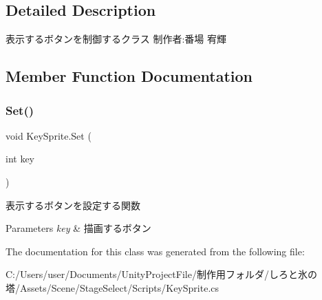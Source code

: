 \subsection{Detailed Description}
表示するボタンを制御するクラス 制作者\+:番場 宥輝 



\subsection{Member Function Documentation}
\mbox{\label{class_key_sprite_a04255b122af47585fc67ac88d83f4900}} 
\subsubsection{\texorpdfstring{Set()}{Set()}}
{\footnotesize\ttfamily void Key\+Sprite.\+Set (\begin{DoxyParamCaption}\item[{int}]{key }\end{DoxyParamCaption})\hspace{0.3cm}{\ttfamily [inline]}}



表示するボタンを設定する関数 


\begin{DoxyParams}{Parameters}
{\em key} & 描画するボタン\\
\hline
\end{DoxyParams}


The documentation for this class was generated from the following file\+:\begin{DoxyCompactItemize}
\item 
C\+:/\+Users/user/\+Documents/\+Unity\+Project\+File/制作用フォルダ/しろと氷の塔/\+Assets/\+Scene/\+Stage\+Select/\+Scripts/Key\+Sprite.\+cs\end{DoxyCompactItemize}
